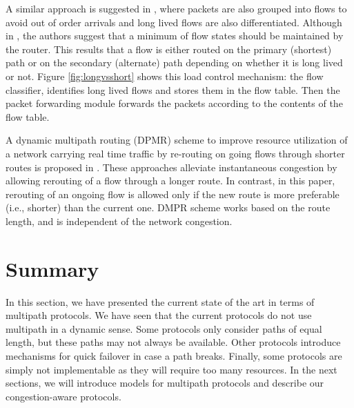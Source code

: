 A similar approach is suggested in \cite{LEE}, where packets are also grouped into flows to avoid out of order arrivals and long lived flows are also differentiated. Although in \cite{LEE}, the authors suggest that a minimum of flow states should be maintained by the router. This results that a flow is either routed on the primary (shortest) path or on the secondary (alternate) path depending on whether it is long lived or not. Figure \ref{fig:longvsshort} shows this load control mechanism: the flow classifier, identifies long lived flows and stores them in the flow table. Then the packet forwarding module forwards the packets according to the contents of the flow table.


A dynamic multipath routing (DPMR) scheme to improve resource utilization of a network carrying
real time traffic by re-routing on going flows through shorter routes is proposed in \cite{DMPR, DEDAS}. These approaches alleviate instantaneous congestion by allowing rerouting of a flow through a longer route. In contrast, in this paper, rerouting of an ongoing flow is allowed only if the new route is more preferable (i.e., shorter) than the current one. DMPR scheme works based on the route length, and is independent of the network congestion. 

\section{Summary}

In this section, we have presented the current state of the art in terms of multipath protocols. We have seen that the current protocols do not use multipath in a dynamic sense. Some protocols only consider paths of equal length, but these paths may not always be available. Other protocols introduce mechanisms for quick failover in case a path breaks. Finally, some protocols are simply not implementable as they will require too many resources. In the next sections, we will introduce models for multipath protocols and describe our congestion-aware protocols.

  




